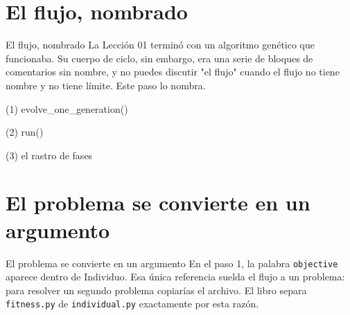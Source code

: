 \section{El flujo, nombrado}

\begin{frame}{El flujo, nombrado}
La Lección 01 terminó con un algoritmo genético que funcionaba. Su cuerpo de ciclo, sin embargo,
era una serie de bloques de comentarios sin nombre, y no puedes discutir "el flujo" cuando el
flujo no tiene nombre y no tiene límite. Este paso lo nombra.
\end{frame}

\begin{frame}[fragile]{(1) evolve\_one\_generation()}

\end{frame}

\begin{frame}[fragile]{(2) run()}

\end{frame}

\begin{frame}[fragile]{(3) el rastro de fases}

\end{frame}


\section{El problema se convierte en un argumento}

\begin{frame}{El problema se convierte en un argumento}
En el paso 1, la palabra \texttt{objective} aparece dentro de Individuo. Esa única referencia
suelda el flujo a un problema: para resolver un segundo problema copiarías el archivo.
El libro separa \texttt{fitness.py} de \texttt{individual.py} exactamente por esta razón.
\end{frame}

